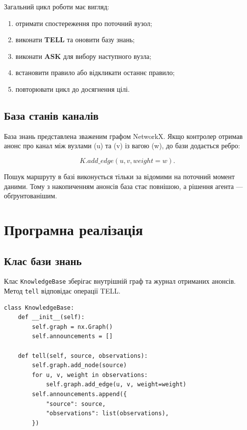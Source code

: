 \documentclass[12pt,a4paper]{article}
\begin{document}
Загальний цикл роботи має вигляд:

\begin{enumerate}[leftmargin=2cm]
  \item отримати спостереження про поточний вузол;
  \item виконати \textbf{TELL} та оновити базу знань;
  \item виконати \textbf{ASK} для вибору наступного вузла;
  \item встановити правило або відкликати останнє правило;
  \item повторювати цикл до досягнення цілі.
\end{enumerate}

\subsection{База станів каналів}

База знань представлена зваженим графом NetworkX. Якщо контролер отримав
анонс про канал між вузлами (u) та (v) із вагою (w), до бази додається
ребро:

\begin{equation}
  K.add\_edge(u,v,weight=w).
\end{equation}

Пошук маршруту в базі виконується тільки за відомими на поточний момент
даними. Тому з накопиченням анонсів база стає повнішою, а рішення агента ---
обґрунтованішим.

\section{Програмна реалізація}

\subsection{Клас бази знань}

Клас \texttt{KnowledgeBase} зберігає внутрішній граф та журнал отриманих
анонсів. Метод \texttt{tell} відповідає операції TELL.

\begin{listing}[H]
\begin{verbatim}
class KnowledgeBase:
    def __init__(self):
        self.graph = nx.Graph()
        self.announcements = []

    def tell(self, source, observations):
        self.graph.add_node(source)
        for u, v, weight in observations:
            self.graph.add_edge(u, v, weight=weight)
        self.announcements.append({
            "source": source,
            "observations": list(observations),
        })
\end{verbatim}
\caption{Збереження знань про стан каналів}
\end{listing}
\end{document}
